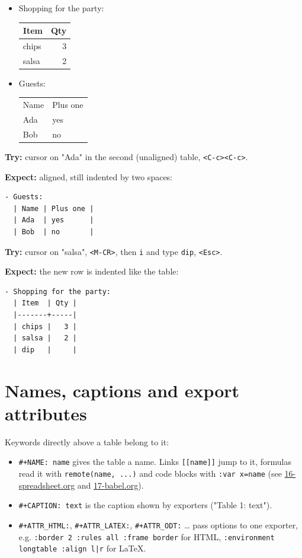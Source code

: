 \begin{itemize}
\item Shopping for the party:
\begin{center}
\begin{tabular}{lr}
Item & Qty\\
\hline
chips & 3\\
salsa & 2\\
\end{tabular}
\end{center}
\item Guests:
\begin{center}
\begin{tabular}{ll}
Name & Plus one\\
Ada & yes\\
Bob & no\\
\end{tabular}
\end{center}
\end{itemize}

\textbf{Try:} cursor on "Ada" in the second (unaligned) table, \texttt{<C-c><C-c>}.

\textbf{Expect:} aligned, still indented by two spaces:
\begin{verbatim}
- Guests:
  | Name | Plus one |
  | Ada  | yes      |
  | Bob  | no       |
\end{verbatim}

\textbf{Try:} cursor on "salsa", \texttt{<M-CR>}, then \texttt{i} and type \texttt{dip}, \texttt{<Esc>}.

\textbf{Expect:} the new row is indented like the table:
\begin{verbatim}
- Shopping for the party:
  | Item  | Qty |
  |-------+-----|
  | chips |   3 |
  | salsa |   2 |
  | dip   |     |
\end{verbatim}
\section{Names, captions and export attributes}
\label{sec:orgcf84e55}
Keywords directly above a table belong to it:

\begin{itemize}
\item \texttt{\#+NAME: name} gives the table a name. Links \texttt{[[name]]} jump to it,
formulas read it with \texttt{remote(name, ...)} and code blocks with
\texttt{:var x=name} (see \href{16-spreadsheet.org}{16-spreadsheet.org} and
\href{17-babel.org}{17-babel.org}).
\item \texttt{\#+CAPTION: text} is the caption shown by exporters ("Table 1: text").
\item \texttt{\#+ATTR\_HTML:}, \texttt{\#+ATTR\_LATEX:}, \texttt{\#+ATTR\_ODT:} \ldots{} pass options to one
exporter, e.g. \texttt{:border 2 :rules all :frame border} for HTML,
\texttt{:environment longtable :align l|r} for \LaTeX{}.
\end{itemize}

